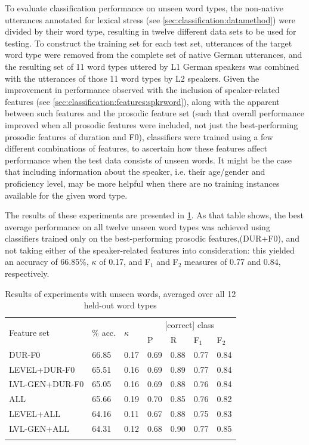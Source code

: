 	
	To evaluate classification performance on unseen word types, the non-native utterances annotated for lexical stress (see \cref{sec:classification:datamethod}) were divided by their word type, resulting in twelve different data sets to be used for testing. To construct the training set for each test set, utterances of the target word type  were removed from the complete set of native German utterances, and the resulting set of 11 word types uttered by L1 German speakers was combined with the utterances of those 11 word types by L2 speakers. Given the improvement in performance observed with the inclusion of speaker-related features (see \cref{sec:classification:features:spkrword}), along with the apparent  between such features and the prosodic feature set (such that overall performance improved when all prosodic features were included, not just the best-performing prosodic features of duration and F0), classifiers were trained using a few  different combinations of features, to ascertain how these features affect performance when the test data consists of unseen words. It might be the case that including information about the speaker, i.e. their age/gender and proficiency level, may be more helpful when there are no training instances available for the given word type. 
	
	The results of these experiments are presented in \cref{tab:results:words}. As that table shows, the best average performance on all twelve unseen word types was achieved using classifiers trained only on the best-performing prosodic features,(DUR+F0), and not taking either of the speaker-related features into consideration: this yielded an accuracy of 66.85\%, $\kappa$ of 0.17, and F$_1$ and F$_2$ measures of 0.77 and 0.84, respectively. 
	
	
	\begin{table}
			\centering
			\caption[Results of experiments with unseen words]{Results of experiments with unseen words, averaged over all 12 held-out word types   }
			\begin{tabularx}{\textwidth}{lXXXXXX}		
			\toprule
			\multirow{2}{*}{Feature set} & \multirow{2}{*}{\% acc.} & \multirow{2}{*}{$\kappa$} & \multicolumn{4}{c}{[correct] class} \\
			\cmidrule(lr){4-7}
			& & & P & R & F$_1$ & F$_2$ \\
			\midrule
DUR-F0	&	66.85	&	0.17	&	0.69	&	0.88	&	0.77	&	0.84	\\
{LEVEL+DUR-F0}	&	65.51	&	0.16	&	0.69	&	0.89	&	0.77	&	0.84	\\
{LVL-GEN+DUR-F0}	&	65.05	&	0.16	&	0.69	&	0.88	&	0.76	&	0.84	\\
			\midrule								
ALL	&	65.66	&	0.19	&	0.70	&	0.85	&	0.76	&	0.82	\\
{LEVEL+ALL}	&	64.16	&	0.11	&	0.67	&	0.88	&	0.75	&	0.83	\\
{LVL-GEN+ALL}	&	64.31	&	0.12	&	0.68	&	0.90	&	0.77	&	0.85	\\

		\bottomrule
			\label{tab:results:words}
			\end{tabularx}
		\end{table}	
	
